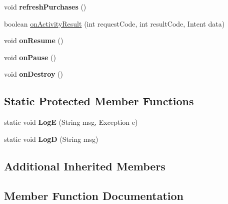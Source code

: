 \begin{DoxyCompactItemize}
void {\bfseries refresh\+Purchases} ()
\item 
boolean \hyperlink{classorg_1_1cocos2dx_1_1plugin_1_1IAPGooglePlay_a8e832a90b2cf2ae8e75d036362159498}{on\+Activity\+Result} (int request\+Code, int result\+Code, Intent data)
\item 
\mbox{\label{classorg_1_1cocos2dx_1_1plugin_1_1IAPGooglePlay_afe55f55dfcc9b2ea878b7d557c7c2e87}} 
void {\bfseries on\+Resume} ()
\item 
\mbox{\label{classorg_1_1cocos2dx_1_1plugin_1_1IAPGooglePlay_a19f529e1f7e7ef79b4892178a0f5d75d}} 
void {\bfseries on\+Pause} ()
\item 
\mbox{\label{classorg_1_1cocos2dx_1_1plugin_1_1IAPGooglePlay_a2ff12869aefb0c215c14149fe4451b74}} 
void {\bfseries on\+Destroy} ()
\end{DoxyCompactItemize}
\subsection*{Static Protected Member Functions}
\begin{DoxyCompactItemize}
\item 
\mbox{\label{classorg_1_1cocos2dx_1_1plugin_1_1IAPGooglePlay_a0432899c8b208db51b3b709f2649489b}} 
static void {\bfseries LogE} (String msg, Exception e)
\item 
\mbox{\label{classorg_1_1cocos2dx_1_1plugin_1_1IAPGooglePlay_a2dc18bf3de4a079662a4b67e58997259}} 
static void {\bfseries LogD} (String msg)
\end{DoxyCompactItemize}
\subsection*{Additional Inherited Members}


\subsection{Member Function Documentation}
\mbox{\label{classorg_1_1cocos2dx_1_1plugin_1_1IAPGooglePlay_a8e832a90b2cf2ae8e75d036362159498}} 
